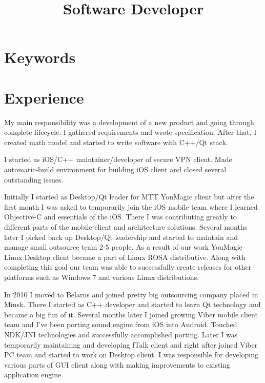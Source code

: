\documentclass[11pt, a4paper]{moderncv}
\title{Software Developer}
\begin{document}
 
\maketitle

\section{Keywords}

\section{Experience}

{
My main responsibility was a development of a new product and going through complete lifecycle. 
I gathered requirements and wrote specification. 
After that, I created math model and started to write software with C++/Qt stack.
}

{
I started as iOS/C++ maintainer/developer of secure VPN client.
Made automatic-build environment for building iOS client and closed several outstanding issues.
}

{
Initially I started as Desktop/Qt leader for MTT YouMagic client but after the first month I was asked to temporarily join the iOS mobile team where  
I learned Objective-C and essentials of the iOS. There I was contributing greatly to different parts of the mobile client and architecture solutions.
Several months later I picked back up Desktop/Qt leadership and started to maintain and manage small outsource team 2-5 people. 
As a result of our work YouMagic Linux Desktop client became a part of Linux ROSA distributive.
Along with completing this goal our team was able to successfully create releases for other platforms such as Windows 7 and various Linux distributions.
}

{
In 2010 I moved to Belarus and joined pretty big outsourcing company placed in Minsk. 
There I started as C++ developer and started to learn Qt technology and became a big fun of it.
Several months later I joined growing Viber mobile client team and I've been porting sound engine from iOS into Android. 
Touched NDK/JNI technologies and successfully accomplished porting.
Later I was temporarily maintaining and developing fTalk client and right after joined Viber PC team and started to work on Desktop client.
I was responsible for developing various parts of GUI client along with making improvements to existing application engine.
}
\end{document}
